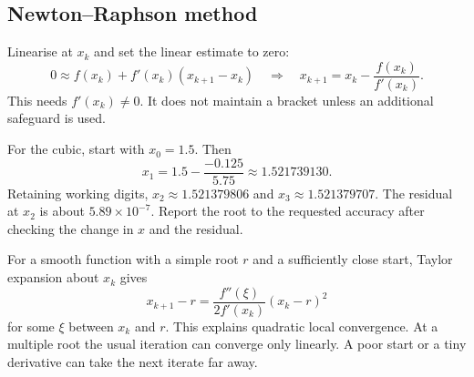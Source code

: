 \documentclass[12pt,a4paper]{article}
\begin{document}
\subsection{Newton--Raphson method}
\begin{tcolorbox}[formulabox, title={Tangent intercept}]
Linearise at $x_k$ and set the linear estimate to zero:
\[
0\approx f(x_k)+f'(x_k)(x_{k+1}-x_k)
 \quad\Longrightarrow\quad
x_{k+1}=x_k-\frac{f(x_k)}{f'(x_k)}.
\]
This needs $f'(x_k)\ne0$. It does not maintain a bracket unless an additional safeguard is used.
\end{tcolorbox}

\begin{tcolorbox}[examplebox, title={Newton iterates and a numerical stopping check}]
For the cubic, start with $x_0=1.5$. Then
\[
x_1=1.5-\frac{-0.125}{5.75}\approx1.521739130.
\]
Retaining working digits, $x_2\approx1.521379806$ and $x_3\approx1.521379707$. The residual at $x_2$ is about $5.89\times10^{-7}$. Report the root to the requested accuracy after checking the change in $x$ and the residual.
\end{tcolorbox}

\begin{tcolorbox}[masonbox, title={Convergence near the root}]
For a smooth function with a simple root $r$ and a sufficiently close start, Taylor expansion about $x_k$ gives
\[
x_{k+1}-r=\frac{f''(\xi)}{2f'(x_k)}(x_k-r)^2
\]
for some $\xi$ between $x_k$ and $r$. This explains quadratic local convergence. At a multiple root the usual iteration can converge only linearly. A poor start or a tiny derivative can take the next iterate far away.
\end{tcolorbox}

\begin{tcolorbox}[tikzbox, title={Bracket, chord and tangent choices}]
\centering
{}\par
\end{tcolorbox}
\end{document}
